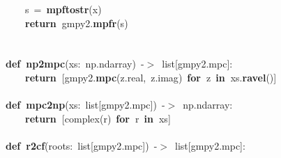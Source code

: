 \documentclass{article}\usepackage[]{graphicx}\usepackage[dvipsnames,table]{xcolor}
\makeatletter
\newcommand{\hlopt}[1]{\textcolor[rgb]{0,0,0}{#1}}%
\newcommand{\hldef}[1]{\textcolor[rgb]{0.345,0.345,0.345}{#1}}%
\newcommand{\hlkwa}[1]{\textcolor[rgb]{0.161,0.373,0.58}{\textbf{#1}}}%
\newcommand{\hlkwb}[1]{\textcolor[rgb]{0.69,0.353,0.396}{#1}}%
\newcommand{\hlkwd}[1]{\textcolor[rgb]{0.737,0.353,0.396}{\textbf{#1}}}%
\newenvironment{kframe}{%
 \def\at@end@of@kframe{}%
 \ifinner\ifhmode%
  \def\at@end@of@kframe{\end{minipage}}%
  \begin{minipage}{\columnwidth}%
 \fi\fi%
 \def\FrameCommand##1{\hskip\@totalleftmargin \hskip-\fboxsep
 \colorbox{shadecolor}{##1}\hskip-\fboxsep
     \hskip-\linewidth \hskip-\@totalleftmargin \hskip\columnwidth}%
 \MakeFramed {\advance\hsize-\width
   \@totalleftmargin\z@ \linewidth\hsize
   \@setminipage}}%
 {\par\unskip\endMakeFramed%
 \at@end@of@kframe}
\newenvironment{knitrout}{}{} %
\makeatother
\begin{document}
\begin{center}
\begin{minipage}[m]{15cm}
\begin{knitrout}
\begin{kframe}
\hldef{}\hldef{\ \ \ \ }\hldef{s\ }\hlopt{=\ }\hldef{}\hlkwd{mpf\textunderscore to\textunderscore str}\hldef{}\hlopt{(}\hldef{x}\hlopt{)}\hldef{\ \ \ \ \ \ \ \ \ }\hlopt{}\hldef{}\hspace*{\fill}\\
\hldef{}\hldef{\ \ \ \ }\hldef{}\hlkwa{return\ }\hldef{gmpy2}\hlopt{.}\hldef{}\hlkwd{mpfr}\hldef{}\hlopt{(}\hldef{s}\hlopt{)}\hspace*{\fill}\\
\hldef{}\hspace*{\fill}\\
\hldef{}\hspace*{\fill}\\
\hldef{}\hlkwa{def\ }\hldef{}\hlkwd{np2mpc}\hldef{}\hlopt{(}\hldef{xs}\hlopt{:\ }\hldef{np}\hlopt{.}\hldef{ndarray}\hlopt{)\ {-}$>$\ }\hldef{}\hlkwb{list}\hldef{}\hlopt{{[}}\hldef{gmpy2}\hlopt{.}\hldef{mpc}\hlopt{{]}:}\hspace*{\fill}\\
\hldef{}\hldef{\ \ \ \ }\hldef{}\hlkwa{return\ }\hldef{}\hlopt{{[}}\hldef{gmpy2}\hlopt{.}\hldef{}\hlkwd{mpc}\hldef{}\hlopt{(}\hldef{z}\hlopt{.}\hldef{real}\hlopt{,\ }\hldef{z}\hlopt{.}\hldef{imag}\hlopt{)\ }\hldef{}\hlkwa{for\ }\hldef{z\ }\hlkwa{in\ }\hldef{xs}\hlopt{.}\hldef{}\hlkwd{ravel}\hldef{}\hlopt{(){]}}\hspace*{\fill}\\
\hldef{}\hspace*{\fill}\\
\hldef{}\hlkwa{def\ }\hldef{}\hlkwd{mpc2np}\hldef{}\hlopt{(}\hldef{xs}\hlopt{:\ }\hldef{}\hlkwb{list}\hldef{}\hlopt{{[}}\hldef{gmpy2}\hlopt{.}\hldef{mpc}\hlopt{{]})\ {-}$>$\ }\hldef{np}\hlopt{.}\hldef{ndarray}\hlopt{:}\hspace*{\fill}\\
\hldef{}\hldef{\ \ \ \ }\hldef{}\hlkwa{return\ }\hldef{}\hlopt{{[}}\hldef{}\hlkwb{complex}\hldef{}\hlopt{(}\hldef{r}\hlopt{)\ }\hldef{}\hlkwa{for\ }\hldef{r\ }\hlkwa{in\ }\hldef{xs}\hlopt{{]}}\hspace*{\fill}\\
\hldef{}\hspace*{\fill}\\
\hldef{}\hlkwa{def\ }\hldef{}\hlkwd{r2cf}\hldef{}\hlopt{(}\hldef{roots}\hlopt{:\ }\hldef{}\hlkwb{list}\hldef{}\hlopt{{[}}\hldef{gmpy2}\hlopt{.}\hldef{mpc}\hlopt{{]})\ {-}$>$\ }\hldef{}\hlkwb{list}\hldef{}\hlopt{{[}}\hldef{gmpy2}\hlopt{.}\hldef{mpc}\hlopt{{]}:}\hspace*{\fill}\\

\end{kframe}
\end{knitrout}
\end{minipage}
\end{center}
\end{document}
